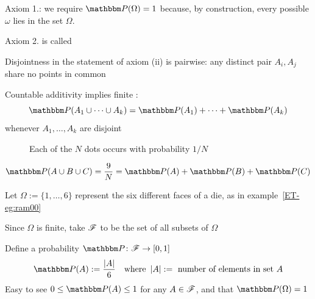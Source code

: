 \begin{frame}
    
    \vspace{2em}
    Axiom 1.: we require $\PP(\Omega) = 1$
    because, by construction, every possible $\omega$ lies in the set $\Omega$.

    Axiom 2. is called 
    
    Disjointness
    in the statement of axiom (ii) is pairwise: any distinct pair $A_i, A_j$ share
    no points in common
    
    Countable additivity implies finite :
    \begin{equation}
        \label{eq:add}
        \PP(A_1 \cup \cdots \cup A_k)
        = \PP (A_1) + \cdots + \PP (A_k)
    \end{equation}
    whenever $A_1, \ldots, A_k$ are disjoint
    
\end{frame}

\begin{frame}
    
    \vspace{2em}
    \begin{figure}
       \begin{center}
        \scalebox{.23}{}
        \caption{\label{f:additivity} Each of the $N$ dots occurs with probability $1/N$}
       \end{center}
    \end{figure}
    \begin{equation*}
    \PP(A \cup B \cup C) = \frac{9}{N}  
    = \PP(A) + \PP(B) + \PP(C)
    \end{equation*}

\end{frame}

\begin{frame}

    \vspace{2em}
    \Eg
    Let $\Omega := \{1,\ldots, 6\}$
    represent the six different faces of a die, as in example~\ref{ET-eg:ram00}
    
    
    Since $\Omega$ is finite, take $\mathscr F$ to be the set of all
    subsets of $\Omega$
    
    Define a probability $\PP \colon \fF \to [0,1]$
    \begin{equation}
        \label{eq:defpd}
        \PP(A) := \frac{|A|}{6}
        \quad \text{where } \, 
        |A| := \text{ number of elements in set $A$}
    \end{equation}
    Easy to see $0 \leq \PP(A) \leq 1$ for
    any $A \in \mathscr F$, and that $\PP(\Omega) = 1$

\end{frame}

